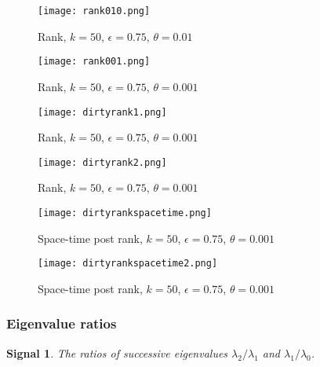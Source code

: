 \documentclass[a4paper,11pt,twoside]{article}
\newtheorem*{signals}{Signal}
\theoremstyle{definition}
\theoremstyle{remark}
\newenvironment{sigs}
   {\colorlet{shadecolor}{green!50}\begin{shaded}\begin{signals}}
   {\end{signals}\end{shaded}}
\begin{document}
\newpage
\begin{figure}[!h]
  \caption{Rank, $k=50$, $\epsilon = 0.75$, $\theta = 0.01$}
  \centering
    \texttt{[image: rank010.png]}
    \label{rank010}
\end{figure}
\begin{figure}[!h]
  \caption{Rank, $k=50$, $\epsilon = 0.75$, $\theta = 0.001$}
  \centering
    \texttt{[image: rank001.png]}
    \label{rank001}
\end{figure}
\newpage
\begin{figure}[!h]
  \caption{Rank, $k=50$, $\epsilon = 0.75$, $\theta = 0.001$}
  \centering
    \texttt{[image: dirtyrank1.png]}
    \label{dirtyrank1}
\end{figure}
\begin{figure}[!h]
  \caption{Rank, $k=50$, $\epsilon = 0.75$, $\theta = 0.001$}
  \centering
    \texttt{[image: dirtyrank2.png]}
    \label{dirtyrank2}
\end{figure}
\newpage
\begin{figure}[!h]
  \caption{Space-time post rank, $k=50$, $\epsilon = 0.75$, $\theta = 0.001$}
  \centering
    \texttt{[image: dirtyrankspacetime.png]}
    \label{dirtyrankspacetime}
\end{figure}
\begin{figure}[!h]
  \caption{Space-time post rank, $k=50$, $\epsilon = 0.75$, $\theta = 0.001$}
  \centering
    \texttt{[image: dirtyrankspacetime2.png]}
    \label{dirtyrankspacetime2}
\end{figure}
\newpage
\subsubsection{Eigenvalue ratios}\label{erats}
\begin{sigs} The ratios of successive eigenvalues $\lambda_2/\lambda_1$ and $\lambda_1/\lambda_0$.
\end{sigs}
\end{document}
